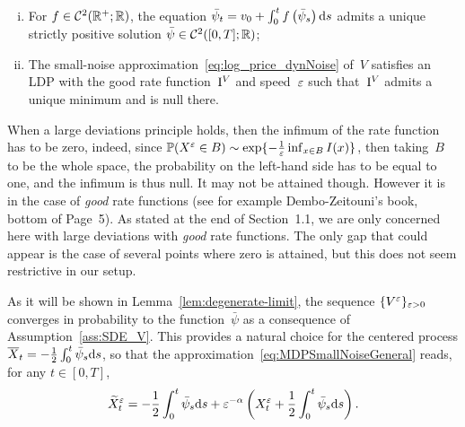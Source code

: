 \begin{assumption}\label{ass:SDE_V}\ 
\begin{enumerate}[(i)]
    \item For $f\in \mathcal{C}^2(\mathbb{R}^{+}; \mathbb{R})$, 
    the equation $\bar\psi_t = v_0 + \int_0^t f\left(\bar\psi_s\right)\mathrm{d} s$ admits a unique strictly positive solution $\bar\psi\in\mathcal{C}^2([0,T]; \mathbb{R})$;
    \item The small-noise approximation~\eqref{eq:log_price_dynNoise} of~$V$ satisfies an LDP with the good rate function~$\mathrm{I}^{V}$ and speed~$\varepsilon$ such that~$\mathrm{I}^{V}$ admits a unique minimum and is null there.
\end{enumerate}
\end{assumption}
\begin{remark}
When a large deviations principle holds,
then the infimum of the rate function has to be zero, indeed, since 
$\mathbb{P}(X^\varepsilon \in B)\sim \exp\{-\frac{1}{\varepsilon}\inf_{x\in B} I(x)\}$,
then taking~$B$ to be the whole space,  
the probability on the left-hand side has to be equal to one, and the infimum is thus null. 
It may not be attained though. 
However it is in the case of \emph{good} rate functions (see for example Dembo-Zeitouni's book, bottom of Page~5). 
As stated at the end of Section~1.1, we are only concerned here with large deviations with \emph{good} rate functions.
The only gap that could appear is the case of several points where zero is attained,
but this does not seem restrictive in our setup.
\end{remark}
As it will be shown in Lemma~\ref{lem:degenerate-limit}, 
the sequence $\{V^\varepsilon\}_{\varepsilon>0}$ converges in probability to the function~$\bar\psi$ as a consequence of Assumption~\ref{ass:SDE_V}. 
This provides a natural choice for the centered process 
${\overline{X}_t = -\frac{1}{2}\int_0^t\bar\psi_s\mathrm{d} s}$,
so that the approximation~\eqref{eq:MDPSmallNoiseGeneral}
reads, for any $t\in [0,T]$,
\begin{equation}\label{eq:MDPSmallNoiseX}
\widetilde{X}^\varepsilon_t = -\frac{1}{2} \int_0^t\bar\psi_s \mathrm{d} s + \varepsilon^{-\alpha}\left(X^{\varepsilon}_t + \frac{1}{2} \int_0^t\bar\psi_s \mathrm{d} s\right).
\end{equation}

